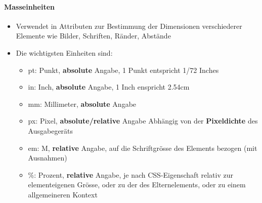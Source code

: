 \documentclass[10pt,a4paper]{article}
\begin{document}
\paragraph{Masseinheiten}
\begin{itemize}[noitemsep,topsep=0pt,leftmargin=*]
    \item Verwendet in Attributen zur Bestimmung der Dimensionen verschiederer Elemente wie Bilder, Schriften, Ränder, Abstände
    \item Die wichtigsten Einheiten sind:
    \begin{itemize}[noitemsep,topsep=0pt,leftmargin=*]
        \item pt: Punkt, \textbf{absolute} Angabe, 1 Punkt entspricht 1/72 Inches
        \item in: Inch, \textbf{absolute} Angabe, 1 Inch enspricht 2.54cm
        \item mm: Millimeter, \textbf{absolute} Angabe
        \item px: Pixel, \textbf{absolute/relative} Angabe Abhängig von der \textbf{Pixeldichte} des Ausgabegeräts
        \item em: M, \textbf{relative} Angabe, auf die Schriftgrösse des Elements bezogen (mit Ausnahmen)
        \item \%: Prozent, \textbf{relative} Angabe, je nach CSS-Eigenschaft relativ zur elementeigenen Grösse, oder zu der des Elternelements, oder zu einem allgemeineren Kontext
    \end{itemize}
\end{itemize}
\end{document}
